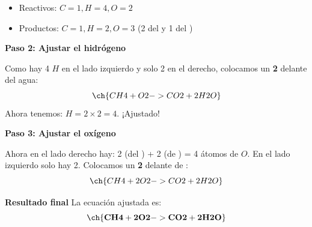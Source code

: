 \begin{itemize}
    \item Reactivos: $C=1, H=4, O=2$
    \item Productos: $C=1, H=2, O=3$ (2 del  y 1 del )
\end{itemize}

        {\noindent \textbf{Paso 2: Ajustar el hidrógeno}}

Como hay 4 $H$ en el lado izquierdo y solo 2 en el derecho, colocamos un \textbf{2} delante del agua:
\[ \ch{CH4 + O2 -> CO2 + 2 H2O} \]
Ahora tenemos: $H = 2 \times 2 = 4$. ¡Ajustado!

        {\noindent \textbf{Paso 3: Ajustar el oxígeno}}

Ahora en el lado derecho hay: 2 (del ) + 2 (de ) = 4 átomos de $O$.
En el lado izquierdo solo hay 2. Colocamos un \textbf{2} delante de :
\[ \ch{CH4 + 2 O2 -> CO2 + 2 H2O} \]

        {\noindent \textbf{Resultado final}} La ecuación ajustada es:
\[ \mathbf{\ch{CH4 + 2 O2 -> CO2 + 2 H2O}} \]


